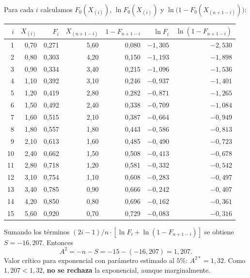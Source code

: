 \documentclass[11pt, letterpaper]{article}
\begin{document}
\begin{ejemplobox}
Para cada $i$ calculamos $F_0(X_{(i)})$, $\ln F_0(X_{(i)})$ y $\ln\bigl(1-F_0(X_{(n+1-i)})\bigr)$:

\begin{center}\scriptsize
\renewcommand{\arraystretch}{1.05}
\begin{tabular}{rrrrrrr}
\toprule
$i$ & $X_{(i)}$ & $F_i$ & $X_{(n{+}1{-}i)}$ & $1-F_{n+1-i}$ & $\ln F_i$ & $\ln(1-F_{n+1-i})$ \\
\midrule
1  & 0{,}70 & 0{,}271 & 5{,}60 & 0{,}080 & $-1{,}305$ & $-2{,}530$ \\
2  & 0{,}80 & 0{,}303 & 4{,}20 & 0{,}150 & $-1{,}193$ & $-1{,}898$ \\
3  & 0{,}90 & 0{,}334 & 3{,}40 & 0{,}215 & $-1{,}096$ & $-1{,}536$ \\
4  & 1{,}10 & 0{,}392 & 3{,}10 & 0{,}246 & $-0{,}937$ & $-1{,}401$ \\
5  & 1{,}20 & 0{,}419 & 2{,}80 & 0{,}282 & $-0{,}871$ & $-1{,}265$ \\
6  & 1{,}50 & 0{,}492 & 2{,}40 & 0{,}338 & $-0{,}709$ & $-1{,}084$ \\
7  & 1{,}60 & 0{,}515 & 2{,}10 & 0{,}387 & $-0{,}664$ & $-0{,}949$ \\
8  & 1{,}80 & 0{,}557 & 1{,}80 & 0{,}443 & $-0{,}586$ & $-0{,}813$ \\
9  & 2{,}10 & 0{,}613 & 1{,}60 & 0{,}485 & $-0{,}490$ & $-0{,}723$ \\
10 & 2{,}40 & 0{,}662 & 1{,}50 & 0{,}508 & $-0{,}413$ & $-0{,}678$ \\
11 & 2{,}80 & 0{,}718 & 1{,}20 & 0{,}581 & $-0{,}332$ & $-0{,}542$ \\
12 & 3{,}10 & 0{,}754 & 1{,}10 & 0{,}608 & $-0{,}283$ & $-0{,}497$ \\
13 & 3{,}40 & 0{,}785 & 0{,}90 & 0{,}666 & $-0{,}242$ & $-0{,}407$ \\
14 & 4{,}20 & 0{,}850 & 0{,}80 & 0{,}696 & $-0{,}162$ & $-0{,}361$ \\
15 & 5{,}60 & 0{,}920 & 0{,}70 & 0{,}729 & $-0{,}083$ & $-0{,}316$ \\
\bottomrule
\end{tabular}
\end{center}

Sumando los términos $(2i-1)/n\cdot[\ln F_i + \ln(1-F_{n+1-i})]$ se obtiene $S = -16{,}207$. Entonces
\[
A^2 = -n - S = -15 - (-16{,}207) = 1{,}207.
\]
Valor crítico para exponencial con parámetro estimado al $5\%$: $A^{2*} = 1{,}32$. Como $1{,}207 < 1{,}32$, \textbf{no se rechaza} la exponencial, aunque marginalmente.
\end{ejemplobox}
\end{document}
